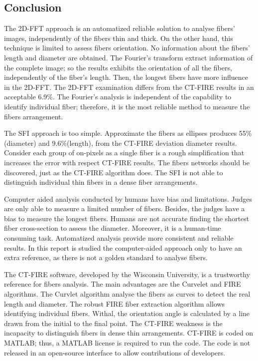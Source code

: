 \documentclass[12pt,a4paper]{article}
\begin{document}
\subsection{Conclusion}
The 2D-FFT approach is an automatized reliable solution to analyse fibers' images, independently of the fibers thin and thick. On the other hand, this technique is limited to assess fibers orientation. No information about the fibers' length and diameter are obtained. The Fourier's transform extract information of the complete image; so the results exhibits the orientation of all the fibers, independently of the fiber's length. Then, the longest fibers have more influence in the 2D-FFT. The 2D-FFT examination differs from the CT-FIRE results in an acceptable 6.9\%. The Fourier's analysis is independent of the capability to identify individual fiber; therefore, it is the most reliable method to measure the fibers arrangement.

The SFI approach is too simple. Approximate the fibers as ellipses produces 55\% (diameter) and 9.6\%(length), from the CT-FIRE deviation diameter results. Consider each group of on-pixels as a single fiber is a rough simplification that increases the error with respect CT-FIRE results. The fibers networks should be discovered, just as the CT-FIRE algorithm does. The SFI is not able to distinguish individual thin fibers in a dense fiber arrangements. 

Computer aided analysis conducted by humans have bias and limitations. Judges are only able to measure a limited number of fibers. Besides, the judges have a bias to measure the longest fibers. Humans are not accurate finding the shortest fiber cross-section to assess the diameter. Moreover, it is a human-time consuming task. Automatized analysis provide more consistent and reliable results. In this report is studied the computer-aided approach only to have an extra reference, as there is not a golden standard to analyse fibers. 

The CT-FIRE software, developed by the Wisconsin University, is a trustworthy reference for fibers analysis. The main advantages are the Curvelet and FIRE algorithms. The Curvlet algorithm analyse the fibers as curves to detect the real length and diameter. The robust FIRE fiber extraction algorithm allows identifying individual fibers. Withal, the orientation angle is calculated by a line drawn from the initial to the final point. The CT-FIRE weakness is the incapacity to distinguish fibers in dense thin arrangements. CT-FIRE is coded on MATLAB; thus, a MATLAB license is required to run the code. The code is not released in an open-source interface to allow contributions of developers.  
\end{document}
